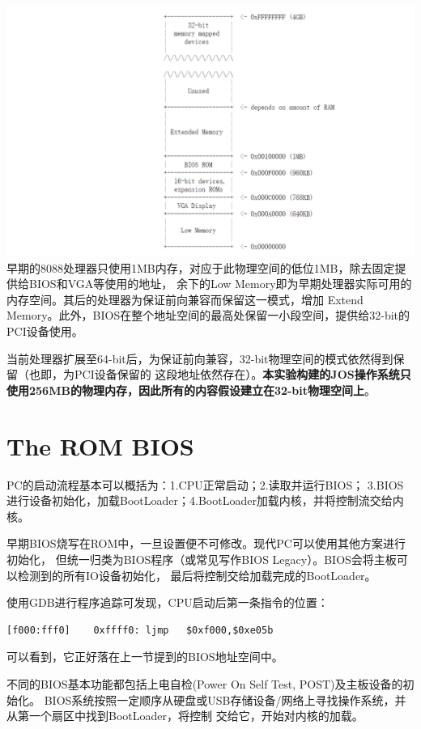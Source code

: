 \documentclass[12pt, letterpaper]{report}
\begin{document}
\includegraphics[width=\textwidth]{PC_PhysicalAddressSpace}
早期的8088处理器只使用1MB内存，对应于此物理空间的低位1MB，除去固定提供给BIOS和VGA等使用的地址，
余下的Low Memory即为早期处理器实际可用的内存空间。其后的处理器为保证前向兼容而保留这一模式，增加
Extend Memory。此外，BIOS在整个地址空间的最高处保留一小段空间，提供给32-bit的PCI设备使用。\par
当前处理器扩展至64-bit后，为保证前向兼容，32-bit物理空间的模式依然得到保留（也即，为PCI设备保留的
这段地址依然存在）。\textbf{本实验构建的JOS操作系统只使用256MB的物理内存，因此所有的内容假设建立在32-bit物理空间上}。\par

\section[\large The ROM BIOS]{The ROM BIOS}
PC的启动流程基本可以概括为：1.CPU正常启动；2.读取并运行BIOS；
3.BIOS进行设备初始化，加载BootLoader；4.BootLoader加载内核，并将控制流交给内核。\par 
早期BIOS烧写在ROM中，一旦设置便不可修改。现代PC可以使用其他方案进行初始化，
但统一归类为BIOS程序（或常见写作BIOS Legacy）。BIOS会将主板可以检测到的所有IO设备初始化，
最后将控制交给加载完成的BootLoader。\par
使用GDB进行程序追踪可发现，CPU启动后第一条指令的位置：
\lstset{style=AssemblyStyle}
\setmainfont{Consolas}
\begin{lstlisting}
[f000:fff0]    0xffff0: ljmp   $0xf000,$0xe05b
\end{lstlisting}
\setmainfont{Times New Roman}
可以看到，它正好落在上一节提到的BIOS地址空间中。\par 
不同的BIOS基本功能都包括上电自检(Power On Self Test, POST)及主板设备的初始化。
BIOS系统按照一定顺序从硬盘或USB存储设备/网络上寻找操作系统，并从第一个扇区中找到BootLoader，将控制
交给它，开始对内核的加载。\par 
\quad \par 
\end{document}
